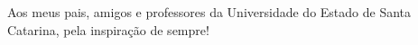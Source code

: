 \begin{dedicatoria}
   \vspace*{\fill}

{%
	\noindent\hspace{.5\textwidth}
	{\begin{minipage}{.5\textwidth}
			\begin{flushleft}
				Aos meus pais, amigos e professores da Universidade do Estado de Santa Catarina, pela inspiração de sempre!
			\end{flushleft}
	\end{minipage}}%
\vspace*{3cm}
}%

\end{dedicatoria}
